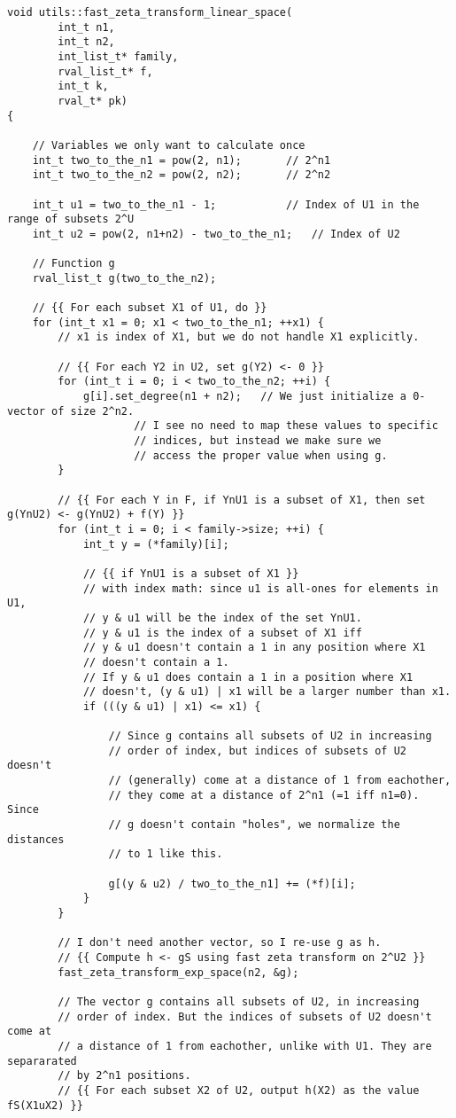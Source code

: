 \documentclass[a4paper, titlepage]{article}
\begin{document}
\begin{verbatim}
void utils::fast_zeta_transform_linear_space(
		int_t n1,
		int_t n2,
		int_list_t* family,
		rval_list_t* f,
		int_t k,
		rval_t* pk)
{

	// Variables we only want to calculate once
	int_t two_to_the_n1 = pow(2, n1);		// 2^n1
	int_t two_to_the_n2 = pow(2, n2);		// 2^n2

	int_t u1 = two_to_the_n1 - 1;			// Index of U1 in the range of subsets 2^U
	int_t u2 = pow(2, n1+n2) - two_to_the_n1;	// Index of U2

	// Function g
	rval_list_t g(two_to_the_n2);

	// {{ For each subset X1 of U1, do }}
	for (int_t x1 = 0; x1 < two_to_the_n1; ++x1) {
		// x1 is index of X1, but we do not handle X1 explicitly.

		// {{ For each Y2 in U2, set g(Y2) <- 0 }}
		for (int_t i = 0; i < two_to_the_n2; ++i) {
			g[i].set_degree(n1 + n2);	// We just initialize a 0-vector of size 2^n2.
					// I see no need to map these values to specific
					// indices, but instead we make sure we
					// access the proper value when using g.
		}

		// {{ For each Y in F, if YnU1 is a subset of X1, then set g(YnU2) <- g(YnU2) + f(Y) }}
		for (int_t i = 0; i < family->size; ++i) {
			int_t y = (*family)[i];

			// {{ if YnU1 is a subset of X1 }}
			// with index math: since u1 is all-ones for elements in U1,
			// y & u1 will be the index of the set YnU1.
			// y & u1 is the index of a subset of X1 iff
			// y & u1 doesn't contain a 1 in any position where X1
			// doesn't contain a 1. 
			// If y & u1 does contain a 1 in a position where X1
			// doesn't, (y & u1) | x1 will be a larger number than x1.
			if (((y & u1) | x1) <= x1) {
				
				// Since g contains all subsets of U2 in increasing
				// order of index, but indices of subsets of U2 doesn't
				// (generally) come at a distance of 1 from eachother, 
				// they come at a distance of 2^n1 (=1 iff n1=0). Since
				// g doesn't contain "holes", we normalize the distances
				// to 1 like this.
				
				g[(y & u2) / two_to_the_n1] += (*f)[i];
			}
		}
		
		// I don't need another vector, so I re-use g as h.
		// {{ Compute h <- gS using fast zeta transform on 2^U2 }}
		fast_zeta_transform_exp_space(n2, &g);

		// The vector g contains all subsets of U2, in increasing
		// order of index. But the indices of subsets of U2 doesn't come at
		// a distance of 1 from eachother, unlike with U1. They are separarated 
		// by 2^n1 positions.
		// {{ For each subset X2 of U2, output h(X2) as the value fS(X1uX2) }}
		

\end{verbatim}
\end{document}
